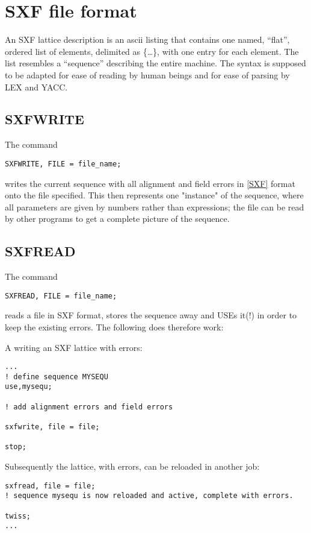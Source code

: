 
\chapter{SXF file format}

An SXF lattice description is an ascii listing that contains one named,
``flat'', ordered list of elements, delimited as \{\ldots\}, with one
entry for each element. The list resembles a \madx ``sequence'' describing
the entire machine. The syntax is supposed to be adapted for ease of
reading by human beings and for ease of parsing by LEX and YACC. 

\section{SXFWRITE}

The command 
\begin{verbatim}
SXFWRITE, FILE = file_name;
\end{verbatim} 
writes the current  sequence with all alignment and
field errors in \href{../Introduction/bibliography.html#SXF}{[SXF]}
format onto the file specified. This then represents one "instance" of
the sequence, where all parameters are given by numbers rather than
expressions; the file can be read by other programs to get a complete
picture of the sequence.  



\section{SXFREAD}

The command 
\begin{verbatim}
SXFREAD, FILE = file_name;
\end{verbatim} 
reads a file in SXF format, stores the sequence away and USEs it(!) in
order to keep the existing errors. The following does therefore work:

A writing an SXF lattice with errors:
\begin{verbatim}
...
! define sequence MYSEQU
use,mysequ;

! add alignment errors and field errors

sxfwrite, file = file;

stop;
\end{verbatim}

Subsequently the lattice, with errors, can be reloaded in another \madx job:

\begin{verbatim}
sxfread, file = file;
! sequence mysequ is now reloaded and active, complete with errors.

twiss;
...
\end{verbatim}


